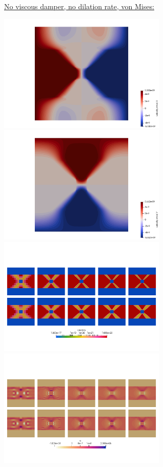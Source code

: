 \newpage
\underline{No viscous damper, no dilation rate, von Mises:}

\begin{center}
\includegraphics[width=8cm]{python_codes/fieldstone_39/results_shortening_block/u}
\includegraphics[width=8cm]{python_codes/fieldstone_39/results_shortening_block/v}\\
\includegraphics[width=8cm]{python_codes/fieldstone_39/results_shortening_block/etaeff}
\includegraphics[width=8cm]{python_codes/fieldstone_39/results_shortening_block/p}\\

\end{center}
